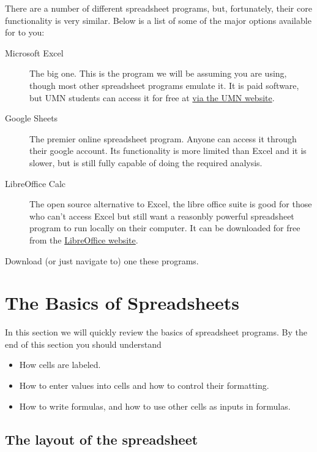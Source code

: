 \documentclass[10pt]{article}
\begin{document}
There are a number of different spreadsheet programs, but, fortunately, their core functionality is very similar. 
Below is a list of some of the major options available for to you:

\begin{description}
    \item[Microsoft Excel] The big one. This is the program we will be assuming you are using, though most other spreadsheet programs emulate it. 
        It is paid software, but UMN students can access it for free at \href{https://it.umn.edu/services-technologies/how-tos/microsoft-office-365-pro-plus-faculty}{via the UMN website}.
    \item[Google Sheets] The premier online spreadsheet program. Anyone can access it through their google account. Its functionality is more limited than Excel and it is slower, but is still fully capable of doing the required analysis.
    \item[LibreOffice Calc] The open source alternative to Excel, the libre office suite is good for those who can't access Excel but still want a reasonbly powerful spreadsheet program to run locally on their computer.
		It can be downloaded for free from the \href{https://www.libreoffice.org/discover/calc/}{LibreOffice website}.
\end{description}


\begin{exercise}
	Download (or just navigate to) one these programs. 
\end{exercise}



\newpage

\section{The Basics of Spreadsheets}%
\label{sec:the_basics_of_spreadsheets}

In this section we will quickly review the basics of spreadsheet programs.
By the end of this section you should understand 
\begin{itemize}
	\item How cells are labeled.
	\item How to enter values into cells and how to control their formatting.
	\item How to write formulas, and how to use other cells as inputs in formulas.
\end{itemize}


\subsection{The layout of the spreadsheet}%
\label{sub:the_layout_of_the_spreadsheet}
\end{document}
